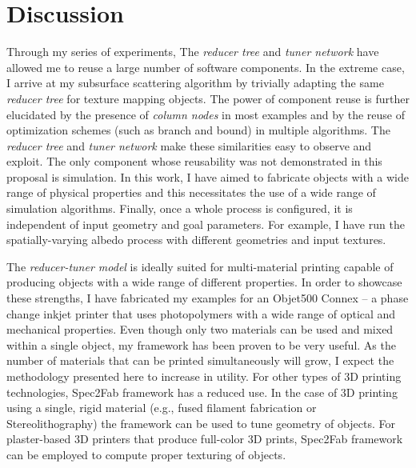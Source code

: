 \chapter{Discussion}
Through my series of experiments, The \emph{reducer tree} and \emph{tuner network}
have allowed me to reuse a large number of software components.
In the extreme case, I arrive at my subsurface scattering algorithm
by trivially adapting the same \emph{reducer tree} for texture mapping objects.
The power of component reuse is further elucidated by the presence of \emph{column nodes} in most examples
and by the reuse of optimization schemes (such as branch and bound) in multiple algorithms.
The \emph{reducer tree} and \emph{tuner network} make these similarities easy to observe and exploit.
The only component whose reusability was not demonstrated in this proposal is simulation.
In this work, I have aimed to fabricate objects with a wide range of physical properties
and this necessitates the use of a wide range of simulation algorithms.
Finally, once a whole process is configured, it is independent of input geometry and goal parameters.
For example, I have run the spatially-varying albedo process with different geometries and input textures.

The \emph{reducer-tuner model} is ideally suited for multi-material printing
capable of producing objects with a wide range of different properties.
In order to showcase these strengths, I have fabricated my examples for an Objet500 Connex --
a phase change inkjet printer that uses photopolymers with a wide range of optical and mechanical properties.
Even though only two materials can be used and mixed within a single object,
my framework has been proven to be very useful. 
As the number of materials that can be printed simultaneously will grow,
I expect the methodology presented here to increase in utility.
For other types of 3D printing technologies, Spec2Fab framework has a reduced use. In the case of 3D printing using a single, rigid material (e.g., fused filament fabrication or Stereolithography) the framework can be used to tune geometry of objects. For plaster-based 3D printers that produce full-color 3D prints, Spec2Fab framework can be employed to compute proper texturing of objects.